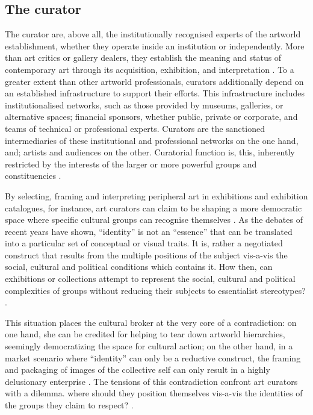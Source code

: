 \subsection{The curator}
The curator are, above all, the institutionally recognised experts of the artworld establishment, whether they operate inside an institution or independently. More than art critics or gallery dealers, they establish the meaning and status of contemporary art through its acquisition, exhibition, and interpretation \autocite[p. 22]{Thi_book}. To a greater extent than other artworld professionals, curators additionally depend on an established infrastructure to support their efforts. This infrastructure includes institutionalised networks, such as those provided by museums, galleries, or alternative spaces; financial sponsors, whether public, private or corporate, and teams of technical or professional experts. Curators are the sanctioned intermediaries of these institutional and professional networks on the one hand, and; artists and audiences on the other. Curatorial function is, this, inherently restricted by the interests of the larger or more powerful groups and constituencies \autocite[p. 22]{Thi_book}.

By selecting, framing and interpreting peripheral art in exhibitions and exhibition catalogues, for instance, art curators can claim to be shaping a more democratic space where specific cultural groups can recognise themselves \autocite[p. 23]{Thi_book}. As the debates of recent years have shown, “identity” is not an “essence” that can be translated into a particular set of conceptual or visual traits. It is, rather a negotiated construct that results from the multiple positions of the subject vis-a-vis the social, cultural and political conditions which contains it. How then, can exhibitions or collections attempt to represent the social, cultural and political complexities of groups without reducing their subjects to essentialist stereotypes? \autocite[p. 23]{Thi_book}.

This situation places the cultural broker at the very core of a contradiction: on one hand, she can be credited for helping to tear down artworld hierarchies, seemingly democratizing the space for cultural action; on the other hand, in a market scenario where “identity” can only be a reductive construct, the framing and packaging of images of the collective self can only result in a highly delusionary enterprise \autocite[p. 23-24]{Thi_book}. The tensions of this contradiction confront art curators with a dilemma. where should they position themselves vis-a-vis the identities of the groups they claim to respect? \autocite[p. 24]{Thi_book}.




